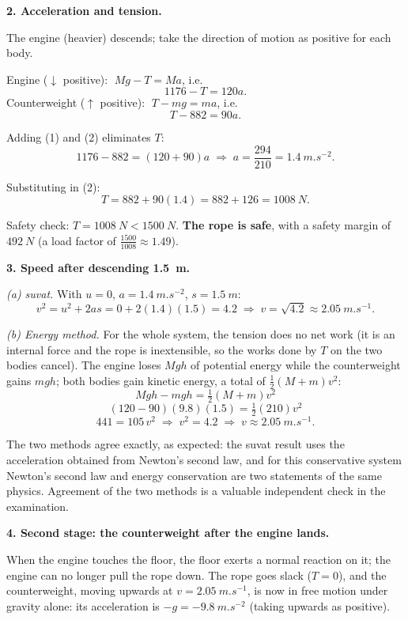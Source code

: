 \documentclass[11pt]{article}
\newcommand{\cle}[1]{{\popxbold\color{popdark}#1}}
\begin{document}
\textbf{2. Acceleration and tension.}

The engine (heavier) descends; take the direction of motion as positive for each body.

Engine ($\downarrow$ positive): $\;Mg - T = Ma$, i.e.
\[ 1176 - T = 120a. \tag{1} \]
Counterweight ($\uparrow$ positive): $\;T - mg = ma$, i.e.
\[ T - 882 = 90a. \tag{2} \]

Adding (1) and (2) eliminates $T$:
\[ 1176 - 882 = (120+90)a \;\Longrightarrow\; a = \frac{294}{210} = \SI{1.4}{m.s^{-2}}. \]

Substituting in (2):
\[ T = 882 + 90(1.4) = 882 + 126 = \SI{1008}{N}. \]

Safety check: $T = \SI{1008}{N} < \SI{1500}{N}$. \textbf{The rope is safe}, with a safety margin of $\SI{492}{N}$ (a load factor of $\frac{1500}{1008} \approx 1.49$).

\textbf{3. Speed after descending \SI{1.5}{m}.}

\emph{(a) suvat.} With $u = 0$, $a = \SI{1.4}{m.s^{-2}}$, $s = \SI{1.5}{m}$:
\[ v^2 = u^2 + 2as = 0 + 2(1.4)(1.5) = 4.2 \;\Longrightarrow\; v = \sqrt{4.2} \approx \SI{2.05}{m.s^{-1}}. \]

\emph{(b) Energy method.} For the whole system, the tension does no net work (it is an internal force and the rope is inextensible, so the works done by $T$ on the two bodies cancel). The engine loses $Mgh$ of potential energy while the counterweight gains $mgh$; both bodies gain kinetic energy, a total of $\tfrac12 (M+m)v^2$:
\[ Mgh - mgh = \tfrac{1}{2}(M+m)v^2 \]
\[ (120-90)(9.8)(1.5) = \tfrac{1}{2}(210)v^2 \]
\[ 441 = 105\,v^2 \;\Longrightarrow\; v^2 = 4.2 \;\Longrightarrow\; v \approx \SI{2.05}{m.s^{-1}}. \]

The two methods agree exactly, as expected: the suvat result uses the acceleration obtained from Newton's second law, and for this conservative system Newton's second law and energy conservation are two statements of the same physics. Agreement of the two methods is a valuable \cle{independent check} in the examination.

\textbf{4. Second stage: the counterweight after the engine lands.}

When the engine touches the floor, the floor exerts a normal reaction on it; the engine can no longer pull the rope down. The rope goes \cle{slack} ($T = 0$), and the counterweight, moving upwards at $v = \SI{2.05}{m.s^{-1}}$, is now in free motion under gravity alone: its acceleration is $-g = \SI{-9.8}{m.s^{-2}}$ (taking upwards as positive).
\end{document}
